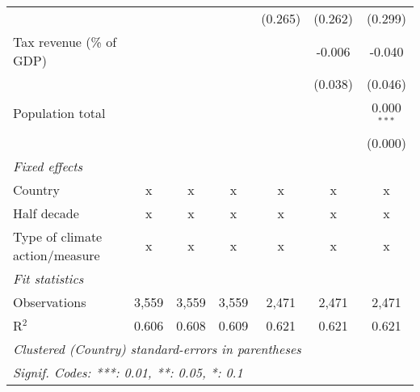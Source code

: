 \begin{tabular}{lcccccc}
                                                  &         &                &                & (0.265)        & (0.262)        & (0.299)\\   
   Tax revenue (\% of GDP)                        &         &                &                &                & -0.006         & -0.040\\   
                                                  &         &                &                &                & (0.038)        & (0.046)\\   
   Population total                               &         &                &                &                &                & 0.000$^{***}$\\   
                                                  &         &                &                &                &                & (0.000)\\   
   \emph{Fixed effects}\\
   Country                                        & x       & x              & x              & x              & x              & x\\  
   Half decade                                    & x       & x              & x              & x              & x              & x\\  
   Type of climate action/measure                 & x       & x              & x              & x              & x              & x\\  
   \midrule \emph{Fit statistics}\\
   Observations                                   & 3,559   & 3,559          & 3,559          & 2,471          & 2,471          & 2,471\\  
   R$^2$                                          & 0.606   & 0.608          & 0.609          & 0.621          & 0.621          & 0.621\\  
   \midrule
   \multicolumn{7}{l}{\emph{Clustered (Country) standard-errors in parentheses}}\\
   \multicolumn{7}{l}{\emph{Signif. Codes: ***: 0.01, **: 0.05, *: 0.1}}\\
\end{tabular}
\par\endgroup


